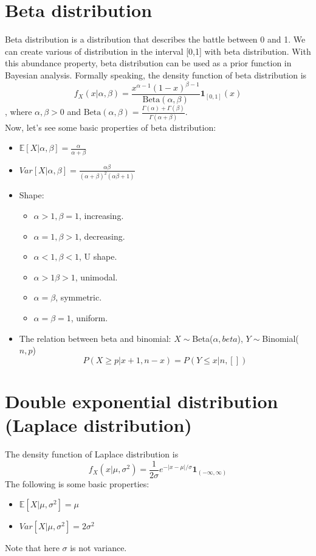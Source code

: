 \documentclass[../Distributions.tex]{subfiles}
\begin{document}
\section{Beta distribution}
Beta distribution is a distribution that describes the battle between 0 and 1. We can create various of distribution in the interval [0,1] with beta distribution. With this abundance property, beta distribution can be used as a prior function in Bayesian analysis. Formally speaking, the density function of beta distribution is
$$f_X(x|\alpha,\beta) = \frac{x^{\alpha-1}(1-x)^{\beta-1}}{\mbox{Beta}(\alpha,\beta)}\mathbf{1}_{[0,1]}(x)$$
, where $\alpha,\beta>0$ and $\mbox{Beta}(\alpha,\beta) = \frac{\Gamma(\alpha)+\Gamma(\beta)}{\Gamma(\alpha+\beta)}$.\\
Now, let's see some basic properties of beta distribution:
\begin{itemize}
	\item $\mathbb{E}[X|\alpha,\beta] = \frac{\alpha}{\alpha+\beta}$
	\item $Var[X|\alpha,\beta] = \frac{\alpha\beta}{(\alpha+\beta)^2(\alpha\beta+1)}$
	\item Shape:
	\begin{itemize}
		\item $\alpha>1,\beta=1$, increasing.
		\item $\alpha=1, \beta > 1$, decreasing.
		\item $\alpha<1,\beta<1$, U shape.
		\item $\alpha>1\beta>1$, unimodal.
		\item $\alpha=\beta$, symmetric.
		\item $\alpha=\beta=1$, uniform.
	\end{itemize}
	\item The relation between beta and binomial: $X\sim$Beta($\alpha,beta$), $Y\sim$Binomial($n,p$)
	$$P(X\geq p|x+1,n-x) = P(Y\leq x|n,[])$$
\end{itemize}

\section{Double exponential distribution (Laplace distribution)}
The density function of Laplace distribution is
$$f_X(x|\mu,\sigma^2) = \frac{1}{2\sigma}e^{-|x-\mu|/\sigma}\mathbf{1}_{(-\infty,\infty)}$$
The following is some basic properties:
\begin{itemize}
	\item $\mathbb{E}[X|\mu,\sigma^2] = \mu$
	\item $Var[X|\mu,\sigma^2] = 2\sigma^2$
\end{itemize}
Note that here $\sigma$ is not variance.
\end{document}
